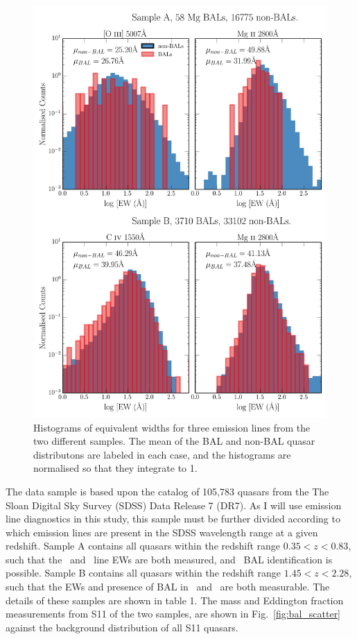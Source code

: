 \begin{figure} %
\centering
\includegraphics[width=1.0\textwidth]{figures/ewpaper/ew_hist_qsos.png}
\caption
{
Histograms of equivalent widths for three emission lines from the two different samples.
The mean of the BAL and non-BAL quasar distributons are labeled in each case, and
the histograms are normalised so that they integrate to 1.
}
\label{fig:ew_hists}
\end{figure} %

The data sample is based upon the
\citet[][hereafter S11]{shen2011} catalog of
105,783 quasars from the The Sloan Digital Sky Survey (SDSS) 
Data Release 7 (DR7). 
As I will use emission line diagnostics in this study,
this sample must be further divided according to which 
emission lines are present in 
the SDSS wavelength range at a given redshift. 
Sample A contains all quasars within the redshift range $0.35<z<0.83$, 
such that the \mgline\ and \oiiifull\ line EWs are both measured, 
and \mg\ BAL identification
is possible.  Sample B contains all quasars within the redshift 
range $1.45<z<2.28$, such that 
the EWs and presence of BAL in \mgline\ and \civline\ are both measurable.
The details of these samples are shown in table 1.
The mass and Eddington fraction measurements from S11 of the two samples,
are shown in Fig.~\ref{fig:bal_scatter}
against the background distribution of all S11 quasars.

